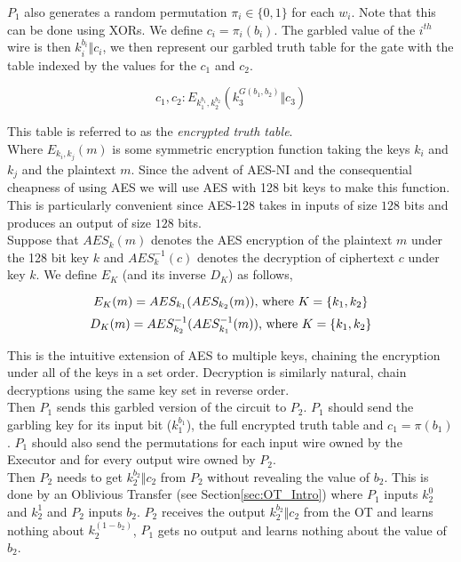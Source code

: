 \documentclass[ %
                    author={Nicholas Tutte},
                supervisor={Prof. Nigel Smart},
                    degree={MEng},
                     title={Secure Two Party Computation},
                  subtitle={A practical comparison of recent protocols},
                      type={Research - GG1K},
                      year={2015} ]{dissertation}
\begin{document}
			$P_1$ also generates a random permutation $\pi_i \in \{0, 1\}$ for each $w_i$. Note that this can be done using XORs. We define $c_i = \pi_i(b_i)$. The garbled value of the $i^{th}$ wire is then $k_i^{b_i} \Vert c_i$, we then represent our garbled truth table for the gate with the table indexed by the values for the $c_1$ and $c_2$.

			$$ c_1, c_2 : E_{k_1^{b_1}, k_2^{b_2}} (k_3^{ G(b_1, b_2) } \Vert c_3) $$

			This table is referred to as the \emph{encrypted truth table}.\\

			Where $E_{k_i, k_j}(m)$ is some symmetric encryption function taking the keys $k_i$ and $k_j$ and the plaintext $m$. Since the advent of AES-NI and the consequential cheapness of using AES we will use AES with 128 bit keys to make this function. This is particularly convenient since AES-128 takes in inputs of size $128$ bits and produces an output of size $128$ bits.\\

			Suppose that $AES_k(m)$ denotes the AES encryption of the plaintext $m$ under the 128 bit key $k$ and $AES^{-1}_k(c)$ denotes the decryption of ciphertext $c$ under key $k$. We define $E_K$ (and its inverse $D_K$) as follows,

			$$ E_K(m) = AES_{k_1}( AES_{k_2}(m)) \textnormal{, where } K = \{k_1, k_2\}$$ 
			$$ D_K(m) = AES^{-1}_{k_2}( AES^{-1}_{k_{1}}(m)) \textnormal{, where } K = \{k_1, k_2\}$$ 

			This is the intuitive extension of AES to multiple keys, chaining the encryption under all of the keys in a set order. Decryption is similarly natural, chain decryptions using the same key set in reverse order.\\

			Then $P_1$ sends this garbled version of the circuit to $P_2$. $P_1$ should send the garbling key for its input bit ($k_1^{b_1}$), the full encrypted truth table and $c_1 = \pi(b_1)$. $P_1$ should also send the permutations for each input wire owned by the Executor and for every output wire owned by $P_2$.\\

			Then $P_2$ needs to get $k_2^{b_2} \Vert c_2$ from $P_2$ without revealing the value of $b_2$. This is done by an Oblivious Transfer (see Section\ref{sec:OT_Intro}) where $P_1$ inputs $k_2^0$ and $k_2^1$ and $P_2$ inputs $b_2$. $P_2$ receives the output $k_2^{b_2} \Vert c_2$ from the OT and learns nothing about $k_2^{(1 - b_2)} $, $P_1$ gets no output and learns nothing about the value of $b_2$.\\
\end{document}
